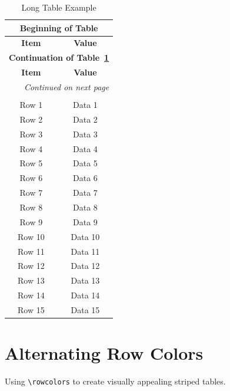 \documentclass[12pt]{article}
\begin{document}
	\begin{longtable}[c]{|c|c|}
		\caption{Long Table Example}
		\label{long}\\
		
		\hline
		\multicolumn{2}{|c|}{\textbf{Beginning of Table}} \\
		\hline
		\textbf{Item} & \textbf{Value} \\
		\hline
		\endfirsthead
		
		\hline
		\multicolumn{2}{|c|}{\textbf{Continuation of Table~\ref{long}}} \\
		\hline
		\textbf{Item} & \textbf{Value} \\
		\hline
		\endhead
		
		\hline
		\multicolumn{2}{|r|}{\textit{Continued on next page}} \\
		\hline
		\endfoot
		
		\hline
		\multicolumn{2}{|c|}{\textbf{End of Table}} \\
		\hline\hline
		\endlastfoot
		
		Row 1 & Data 1 \\
		Row 2 & Data 2 \\
		Row 3 & Data 3 \\
		Row 4 & Data 4 \\
		Row 5 & Data 5 \\
		Row 6 & Data 6 \\
		Row 7 & Data 7 \\
		Row 8 & Data 8 \\
		Row 9 & Data 9 \\
		Row 10 & Data 10 \\
		Row 11 & Data 11 \\
		Row 12 & Data 12 \\
		Row 13 & Data 13 \\
		Row 14 & Data 14 \\
		Row 15 & Data 15 \\
	\end{longtable}
	
	\section{Alternating Row Colors}
	Using \texttt{\textbackslash rowcolors} to create visually appealing striped tables.
	
\end{document}
